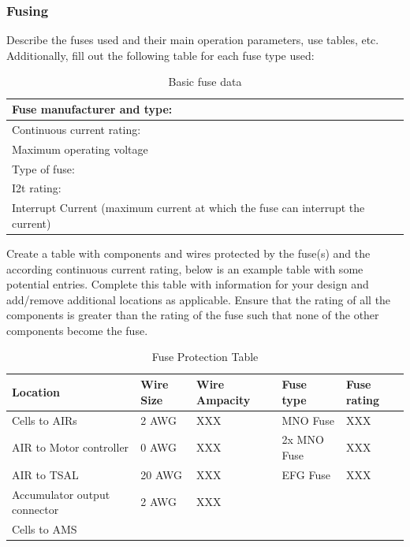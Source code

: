 \subsubsection{Fusing}
Describe the fuses used and their main operation parameters, use tables, etc.
Additionally, fill out the following table for each fuse type used:

\begin{table}[H]
	\centering
	\caption{Basic fuse data}
	\begin{tabularx}{\textwidth}{|X|X|}
		\hline
		Fuse manufacturer and type: &  \\[\TableSize]
		\hline
		Continuous current rating:  &  \\[\TableSize]
		\hline
		Maximum operating voltage  &  \\[\TableSize]
		\hline
		Type of fuse: &  \\[\TableSize]
		\hline
		I2t rating: &  \\[\TableSize]
		\hline
		Interrupt Current (maximum current at which the fuse can interrupt the current) &  \\[\TableSize]
		\hline
	\end{tabularx}%
	\label{tab:acc-fuse}%
\end{table}%

Create a table with components and wires protected by the fuse(s) and the according continuous current rating, below is an example table with some potential entries.  Complete this table with information for your design and add/remove additional locations as applicable.  Ensure that the rating of all the components is greater than the rating of the fuse such that none of the other components become the fuse.

\begin{table}[H]
	\centering
	\caption{Fuse Protection Table}
	\begin{tabularx}{\textwidth}{|X|X|X|X|X|}
		\hline
		Location & Wire Size & Wire Ampacity & Fuse type & Fuse rating\\[\TableSize]
		\hline
		Cells to AIRs & 2 AWG & XXX & MNO Fuse & XXX \\[\TableSize]
		\hline
		AIR to Motor controller & 0 AWG & XXX & 2x MNO Fuse & XXX \\[\TableSize]
		\hline
		AIR to TSAL & 20 AWG & XXX & EFG Fuse & XXX \\[\TableSize]
		\hline
		Accumulator output connector & 2 AWG & XXX &     &  \\[\TableSize]
		\hline
		Cells to AMS &     &     &     &  \\[\TableSize]
		\hline
	\end{tabularx}%
	\label{tab:acc-fuse-protection}%
\end{table}%

